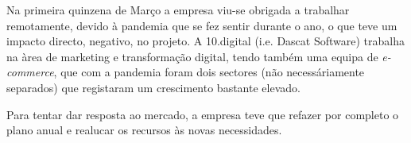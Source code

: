 Na primeira quinzena de Março a empresa viu-se obrigada a trabalhar remotamente, devido à pandemia que se fez sentir durante o ano, o que teve um impacto directo, negativo, no projeto. A 10.digital (i.e. Dascat Software) trabalha na àrea de marketing e transformação digital, tendo também uma equipa de \textit{e-commerce}, que com a pandemia foram dois sectores (não necessáriamente separados) que registaram um crescimento bastante elevado. 

Para tentar dar resposta ao mercado, a empresa teve que refazer por completo o plano anual e realucar os recursos às novas necessidades. 









\blankpage

\glsresetall
